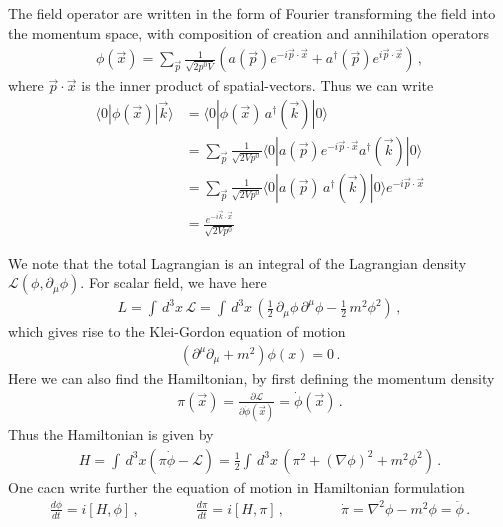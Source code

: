 \documentclass[11pt, onesided]{book}
\theoremstyle{break}
\theoremstyle{break}
\newcommand{\pd}{\partial}
\begin{document}
The field operator are written in the form of Fourier transforming the field into the momentum space, with composition of creation and annihilation operators
\begin{align*}
\phi(\vec{x}) = \sum_{\vec{p}} \frac{1}{\sqrt{2p^0 V}} \left( a(\vec{p}) e^{-i \vec{p}\cdot\vec{x}} + a^\dagger(\vec{p}) e^{i\vec{p}\cdot\vec{x}} \right)\,,
\end{align*}
where $\vec{p}\cdot \vec{x}$ is the inner product of spatial-vectors. Thus we can write
\begin{align*}
\langle 0 |\phi(\vec{x}) |\vec{k}\rangle 
&= \langle 0 |\phi(\vec{x})\, a^\dagger(\vec{k}) |0\rangle \\
&= \sum_{\vec{p}} \frac{1}{\sqrt{2Vp^0}} \langle 0 |a(\vec{p}) e^{-i\vec{p}\cdot\vec{x}} a^\dagger(\vec{k}) |0\rangle\\
&= \sum_{\vec{p}} \frac{1}{\sqrt{2Vp^0}} \langle 0 |a(\vec{p}) \, a^\dagger(\vec{k}) |0\rangle e^{-i\vec{p}\cdot\vec{x}}\\
&= \frac{e^{-i \vec{k}\cdot \vec{x}}}{\sqrt{2Vp^0}}
\end{align*}

We note that the total Lagrangian is an integral of the Lagrangian density $\mathcal{L}(\phi, \pd_\mu \phi)$. For scalar field, we have here
\begin{align*}
L = \int\, d^3 x\, \mathcal{L} = \int \, d^3x\, \left( \frac{1}{2} \, \pd_\mu \phi\, \pd^\mu \phi - \frac{1}{2}\, m^2 \phi^2\right)\,,
\end{align*}
which gives rise to the Klei-Gordon equation of motion
\begin{align*}
\left( \pd^\mu  \pd_\mu + m^2\right) \phi(x) = 0\,.
\end{align*}
Here we can also find the Hamiltonian, by first defining the momentum density
\begin{align*}
\pi(\vec{x}) = \frac{\pd \mathcal{L}}{\pd \dot{\phi}(\vec{x})} = \dot{\phi}(\vec{x})\,.
\end{align*}
Thus the Hamiltonian is given by
\begin{align}
H = \int\, d^3x (\pi \dot{\phi} - \mathcal{L}) = \frac{1}{2}\int \, d^3x\, \left( \pi^2 + (\nabla \phi)^2 + m^2 \phi^2\right)\,.
\end{align}
One cacn write further the equation of motion in Hamiltonian formulation
\begin{align*}
\frac{d\phi}{dt} = i[H, \phi]\,,\qquad \qquad \frac{d\pi}{dt} = i[H, \pi]\,,\qquad\qquad \dot{\pi} = \nabla^2 \phi - m^2 \phi = \ddot{\phi}\,.
\end{align*}
\end{document}
